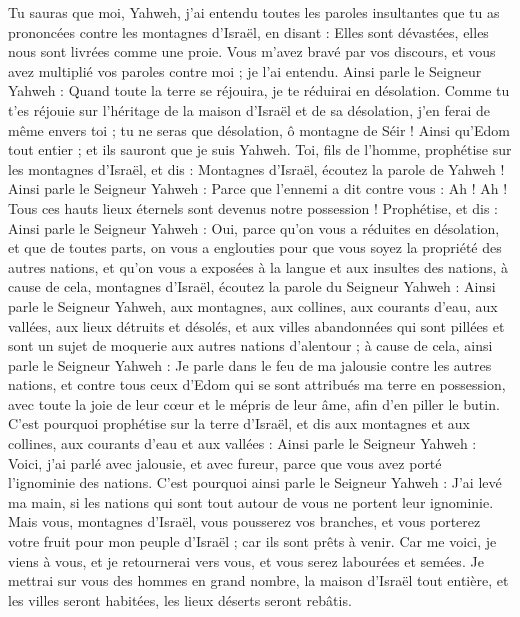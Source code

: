 \begin{multicols}{2}
Tu sauras que moi, Yahweh, j'ai entendu toutes les paroles insultantes que tu as prononcées contre les montagnes d'Israël, en disant : Elles sont dévastées, elles nous sont livrées comme une proie.
Vous m'avez bravé par vos discours, et vous avez multiplié vos paroles contre moi ; je l'ai entendu.
Ainsi parle le Seigneur Yahweh : Quand toute la terre se réjouira, je te réduirai en désolation.
Comme tu t'es réjouie sur l'héritage de la maison d'Israël et de sa désolation, j'en ferai de même envers toi ; tu ne seras que désolation, ô montagne de Séir ! Ainsi qu'Edom tout entier ; et ils sauront que je suis Yahweh.
\VerseOne{}Toi, fils de l'homme, prophétise sur les montagnes d'Israël, et dis : Montagnes d'Israël, écoutez la parole de Yahweh !
Ainsi parle le Seigneur Yahweh : Parce que l'ennemi a dit contre vous : Ah ! Ah ! Tous ces hauts lieux éternels sont devenus notre possession !
Prophétise, et dis : Ainsi parle le Seigneur Yahweh : Oui, parce qu'on vous a réduites en désolation, et que de toutes parts, on vous a englouties pour que vous soyez la propriété des autres nations, et qu'on vous a exposées à la langue et aux insultes des nations,
à cause de cela, montagnes d'Israël, écoutez la parole du Seigneur Yahweh : Ainsi parle le Seigneur Yahweh, aux montagnes, aux collines, aux courants d'eau, aux vallées, aux lieux détruits et désolés, et aux villes abandonnées qui sont pillées et sont un sujet de moquerie aux autres nations d'alentour ;
à cause de cela, ainsi parle le Seigneur Yahweh : Je parle dans le feu de ma jalousie contre les autres nations, et contre tous ceux d'Edom qui se sont attribués ma terre en possession, avec toute la joie de leur cœur et le mépris de leur âme, afin d'en piller le butin.
C'est pourquoi prophétise sur la terre d'Israël, et dis aux montagnes et aux collines, aux courants d'eau et aux vallées : Ainsi parle le Seigneur Yahweh : Voici, j'ai parlé avec jalousie, et avec fureur, parce que vous avez porté l'ignominie des nations.
C'est pourquoi ainsi parle le Seigneur Yahweh : J'ai levé ma main, si les nations qui sont tout autour de vous ne portent leur ignominie.
Mais vous, montagnes d'Israël, vous pousserez vos branches, et vous porterez votre fruit pour mon peuple d'Israël ; car ils sont prêts à venir.
Car me voici, je viens à vous, et je retournerai vers vous, et vous serez labourées et semées.
Je mettrai sur vous des hommes en grand nombre, la maison d'Israël tout entière, et les villes seront habitées, les lieux déserts seront rebâtis.

\end{multicols}
